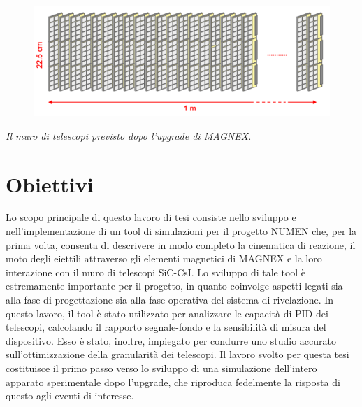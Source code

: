\documentclass[10pt,foldmark,notumble]{leaflet}
\newcommand{\geant}{Geant4}
\begin{document}
\begin{figure} [!h]
	\centering
	\includegraphics[width=0.9\columnwidth, keepaspectratio]{Grafici/muro_telescopi.png}
\end{figure}
\hspace{0.2 cm}\textit{Il muro di telescopi previsto dopo l'upgrade di MAGNEX.}


\section{Obiettivi}

Lo scopo principale di questo lavoro di tesi consiste nello sviluppo e nell'implementazione di un tool di simulazioni per il progetto NUMEN che, per la prima volta, consenta di descrivere in modo completo la cinematica di reazione, il moto degli eiettili attraverso gli elementi magnetici di MAGNEX e la loro interazione con il muro di telescopi SiC-CsI.
Lo sviluppo di tale tool è estremamente importante per il progetto, in quanto coinvolge aspetti legati sia alla fase di progettazione sia alla fase operativa del sistema di rivelazione.
In questo lavoro, il tool è stato utilizzato per analizzare le capacità di PID dei telescopi, calcolando il rapporto segnale-fondo e la sensibilità di misura del dispositivo.
Esso è stato, inoltre, impiegato per condurre uno studio accurato sull'ottimizzazione della granularità dei telescopi.
Il lavoro svolto per questa tesi costituisce il primo passo verso lo sviluppo di una simulazione dell'intero apparato sperimentale dopo l'upgrade, che riproduca fedelmente la risposta di questo agli eventi di interesse.
\end{document}
